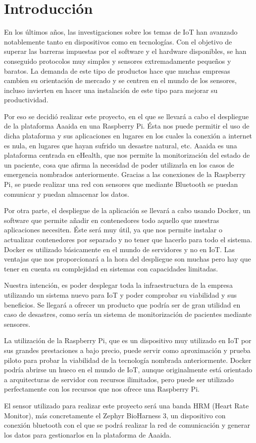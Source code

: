 \cleardoublepage
{}
\chapter*{Introducción}

En los últimos años, las investigaciones sobre los temas de IoT han avanzado notablemente tanto en dispositivos como en tecnologías. Con el objetivo de superar las barreras impuestas por el software y el hardware disponibles, se han conseguido protocolos muy simples y sensores extremadamente pequeños y baratos. La demanda de este tipo de productos hace que muchas empresas cambien su orientación de mercado y se centren en el mundo de los sensores, incluso invierten en hacer una instalación de este tipo para mejorar su productividad. 

Por eso se decidió realizar este proyecto, en el que se llevará a cabo el despliegue de la plataforma Aaaida en una Raspberry Pi. Ésta nos puede permitir el uso de dicha plataforma y sus aplicaciones en lugares en los cuales la conexión a internet es nula, en lugares que hayan sufrido un desastre natural, etc. Aaaida es una plataforma centrada en eHealth, que nos permite la monitorización del estado de un paciente, cosa que afirma la necesidad de poder utilizarla en los casos de emergencia nombrados anteriormente. Gracias a las conexiones de la Raspberry Pi, se puede realizar una red con sensores que mediante Bluetooth se puedan comunicar y puedan almacenar los datos. 

Por otra parte, el despliegue de la aplicación se llevará a cabo usando Docker, un software que permite añadir en contenedores todo aquello que nuestras aplicaciones necesiten. Éste será muy útil, ya que nos permite instalar o actualizar contenedores por separado y no tener que hacerlo para todo el sistema. Docker es utilizado básicamente en el mundo de servidores y no en IoT. Las ventajas que nos proporcionará a la hora del despliegue son muchas pero hay que tener en cuenta su complejidad en sistemas con capacidades limitadas.

Nuestra intención, es poder desplegar toda la infraestructura de la empresa utilizando un sistema nuevo para IoT y poder comprobar su viabilidad y sus beneficios. Se llegará a ofrecer un producto que podría ser de gran utilidad en caso de desastres, como sería un sistema de monitorización de pacientes mediante sensores. 

La utilización de la Raspberry Pi, que es un dispositivo muy utilizado en IoT por sus grandes prestaciones a bajo precio, puede servir como aproximación y prueba piloto para probar la viabilidad de la tecnología nombrada anteriormente. Docker podría abrirse un hueco en el mundo de IoT, aunque originalmente está orientado a arquitecturas de servidor con recursos ilimitados, pero puede ser utilizado perfectamente con los recursos que nos ofrece una Raspberry Pi. 

El sensor utilizado para realizar este proyecto será una banda HRM (Heart Rate Monitor), más concretamente el Zephyr BioHarness 3, un dispositivo con conexión bluetooth con el que se podrá realizar la red de comunicación y generar los datos para gestionarlos en la plataforma de Aaaida. 